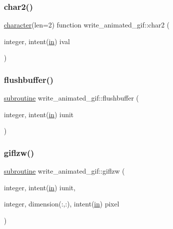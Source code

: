 \subsubsection{\texorpdfstring{char2()}{char2()}}
{\footnotesize\ttfamily \hyperlink{option__stopwatch_83_8txt_abd4b21fbbd175834027b5224bfe97e66}{character}(len=2) function write\+\_\+animated\+\_\+gif\+::char2 (\begin{DoxyParamCaption}\item[{integer, intent(\hyperlink{M__journal_83_8txt_afce72651d1eed785a2132bee863b2f38}{in})}]{ival }\end{DoxyParamCaption})\hspace{0.3cm}{\ttfamily [private]}}

\mbox{\label{M__writegif__animated_8f90_a83cb0569b0e010d8ad27afd1b4cd945e}} 
\subsubsection{\texorpdfstring{flushbuffer()}{flushbuffer()}}
{\footnotesize\ttfamily \hyperlink{M__stopwatch_83_8txt_acfbcff50169d691ff02d4a123ed70482}{subroutine} write\+\_\+animated\+\_\+gif\+::flushbuffer (\begin{DoxyParamCaption}\item[{integer, intent(\hyperlink{M__journal_83_8txt_afce72651d1eed785a2132bee863b2f38}{in})}]{iunit }\end{DoxyParamCaption})\hspace{0.3cm}{\ttfamily [private]}}

\mbox{\label{M__writegif__animated_8f90_aa30b256c6cb90f13a18e32768d35696b}} 
\subsubsection{\texorpdfstring{giflzw()}{giflzw()}}
{\footnotesize\ttfamily \hyperlink{M__stopwatch_83_8txt_acfbcff50169d691ff02d4a123ed70482}{subroutine} write\+\_\+animated\+\_\+gif\+::giflzw (\begin{DoxyParamCaption}\item[{integer, intent(\hyperlink{M__journal_83_8txt_afce72651d1eed785a2132bee863b2f38}{in})}]{iunit,  }\item[{integer, dimension(\+:,\+:), intent(\hyperlink{M__journal_83_8txt_afce72651d1eed785a2132bee863b2f38}{in})}]{pixel }\end{DoxyParamCaption})\hspace{0.3cm}{\ttfamily [private]}}



